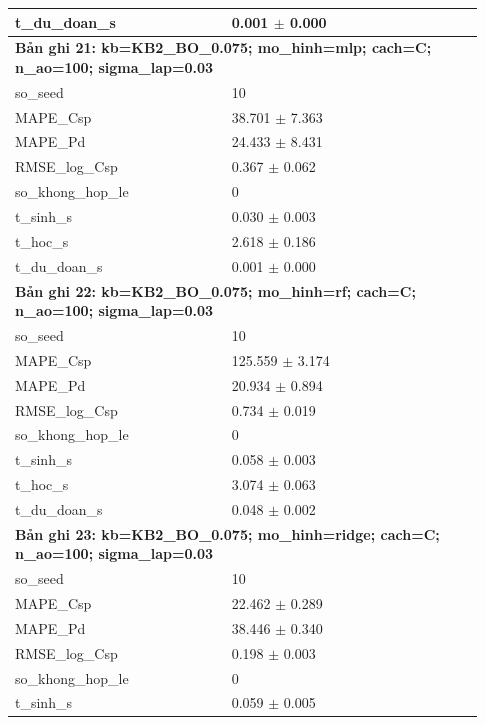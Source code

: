 \begin{longtable}{p{0.43\linewidth}p{0.50\linewidth}}
t\_\allowbreak du\_\allowbreak doan\_\allowbreak s & 0.001 $\pm$ 0.000 \\
\midrule
\multicolumn{2}{p{0.95\linewidth}}{\textbf{Bản ghi 21: kb=KB2\_BO\_0.075; mo\_hinh=mlp; cach=C; n\_ao=100; sigma\_lap=0.03}} \\
so\_\allowbreak seed & 10 \\
MAPE\_\allowbreak Csp & 38.701 $\pm$ 7.363 \\
MAPE\_\allowbreak Pd & 24.433 $\pm$ 8.431 \\
RMSE\_\allowbreak log\_\allowbreak Csp & 0.367 $\pm$ 0.062 \\
so\_\allowbreak khong\_\allowbreak hop\_\allowbreak le & 0 \\
t\_\allowbreak sinh\_\allowbreak s & 0.030 $\pm$ 0.003 \\
t\_\allowbreak hoc\_\allowbreak s & 2.618 $\pm$ 0.186 \\
t\_\allowbreak du\_\allowbreak doan\_\allowbreak s & 0.001 $\pm$ 0.000 \\
\midrule
\multicolumn{2}{p{0.95\linewidth}}{\textbf{Bản ghi 22: kb=KB2\_BO\_0.075; mo\_hinh=rf; cach=C; n\_ao=100; sigma\_lap=0.03}} \\
so\_\allowbreak seed & 10 \\
MAPE\_\allowbreak Csp & 125.559 $\pm$ 3.174 \\
MAPE\_\allowbreak Pd & 20.934 $\pm$ 0.894 \\
RMSE\_\allowbreak log\_\allowbreak Csp & 0.734 $\pm$ 0.019 \\
so\_\allowbreak khong\_\allowbreak hop\_\allowbreak le & 0 \\
t\_\allowbreak sinh\_\allowbreak s & 0.058 $\pm$ 0.003 \\
t\_\allowbreak hoc\_\allowbreak s & 3.074 $\pm$ 0.063 \\
t\_\allowbreak du\_\allowbreak doan\_\allowbreak s & 0.048 $\pm$ 0.002 \\
\midrule
\multicolumn{2}{p{0.95\linewidth}}{\textbf{Bản ghi 23: kb=KB2\_BO\_0.075; mo\_hinh=ridge; cach=C; n\_ao=100; sigma\_lap=0.03}} \\
so\_\allowbreak seed & 10 \\
MAPE\_\allowbreak Csp & 22.462 $\pm$ 0.289 \\
MAPE\_\allowbreak Pd & 38.446 $\pm$ 0.340 \\
RMSE\_\allowbreak log\_\allowbreak Csp & 0.198 $\pm$ 0.003 \\
so\_\allowbreak khong\_\allowbreak hop\_\allowbreak le & 0 \\
t\_\allowbreak sinh\_\allowbreak s & 0.059 $\pm$ 0.005 \\

\end{longtable}
